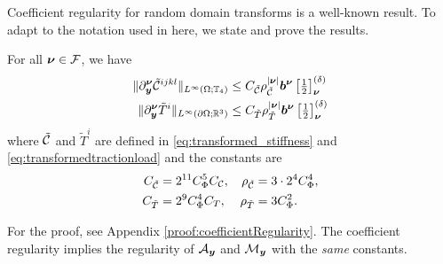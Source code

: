 Coefficient regularity for random domain transforms is a well-known result. To adapt to the notation used in here, we state and prove the results.
\begin{lemma}\label{lemma:coefficientGevreyRegularity}
      For all ${\boldsymbol{\nu}} \in \mathcal{F}$, we have
     \begin{align*}
         \| \partial^{{\boldsymbol{\nu}}}_{{\boldsymbol{y}}} \tilde{\mathcal{C}}^{ijkl} \|_{L^\infty(\Omega;\mathbb{T}_4)}  &\leq  C_{\tilde{\mathcal{C}}} \rho_{\tilde{\mathcal{C}}}^{\vert {\boldsymbol{\nu}} \vert}{\boldsymbol{b}}^{{\boldsymbol{\nu}}} \left[\tfrac{1}{2} \right]^{(\delta)}_{{\boldsymbol{\nu}}} \\
       \| \partial^{{\boldsymbol{\nu}}}_{{\boldsymbol{y}}} \tilde T^{i} \|_{L^\infty(\partial \Omega;\mathbb{R}^{3})}  &\leq  C_{\tilde T} \rho_{\tilde{T}}^{\vert {\boldsymbol{\nu}} \vert } {\boldsymbol{b}}^{{\boldsymbol{\nu}}} \left[\tfrac{1}{2} \right]^{(\delta)}_{{\boldsymbol{\nu}}}
     \end{align*}
     where $\tilde{\mathcal{C}}$ and $\tilde{T}^i$ are defined in \eqref{eq:transformed_stiffness} and \eqref{eq:transformedtractionload} and the constants are  \begin{align}\label{eq:constantRegTildeC}
         C_{\tilde{\mathcal{C}}}&= 2^{11} C_{\Phi}^5 C_{\mathcal{C}}, &  \rho_{\tilde{\mathcal{C}}} &= 3\cdot 2^4 C^4_\Phi,    \\
          \label{eq:constantRegTildeTi}
          C_{\tilde T}&=  2^9  C_{\Phi}^4 C_{T}, &  \rho_{\tilde{T}} &= 3C^2_\Phi.
     \end{align}
\end{lemma}
For the proof, see Appendix \ref{proof:coefficientRegularity}.
The coefficient regularity implies the regularity of $\mathcal{A}_{\boldsymbol{y}}$ and $\mathcal{M}_{\boldsymbol{y}}$ with the \emph{same} constants.
